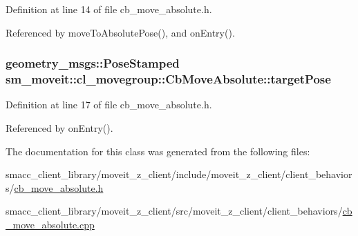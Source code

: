 Definition at line 14 of file cb\+\_\+move\+\_\+absolute.\+h.



Referenced by move\+To\+Absolute\+Pose(), and on\+Entry().

\subsubsection[{\texorpdfstring{target\+Pose}{targetPose}}]{\setlength{\rightskip}{0pt plus 5cm}geometry\+\_\+msgs\+::\+Pose\+Stamped sm\+\_\+moveit\+::cl\+\_\+movegroup\+::\+Cb\+Move\+Absolute\+::target\+Pose}\hypertarget{classsm__moveit_1_1cl__movegroup_1_1CbMoveAbsolute_aba451c75e2dfda0bc38fd043a8b24ab5}{}\label{classsm__moveit_1_1cl__movegroup_1_1CbMoveAbsolute_aba451c75e2dfda0bc38fd043a8b24ab5}


Definition at line 17 of file cb\+\_\+move\+\_\+absolute.\+h.



Referenced by on\+Entry().



The documentation for this class was generated from the following files\+:\begin{DoxyCompactItemize}
\item 
smacc\+\_\+client\+\_\+library/moveit\+\_\+z\+\_\+client/include/moveit\+\_\+z\+\_\+client/client\+\_\+behaviors/\hyperlink{cb__move__absolute_8h}{cb\+\_\+move\+\_\+absolute.\+h}\item 
smacc\+\_\+client\+\_\+library/moveit\+\_\+z\+\_\+client/src/moveit\+\_\+z\+\_\+client/client\+\_\+behaviors/\hyperlink{cb__move__absolute_8cpp}{cb\+\_\+move\+\_\+absolute.\+cpp}\end{DoxyCompactItemize}
